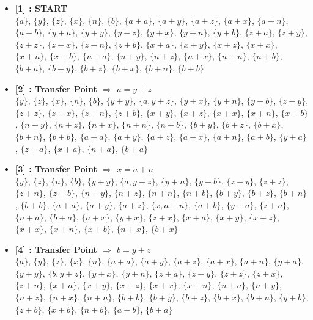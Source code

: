 \begin{itemize}

    \item \textbf{[1] : START}\\
        $\{a\}$, $\{y\}$, $\{z\}$, $\{x\}$, $\{n\}$, $\{b\}$, $\{a + a\}$, $\{a + y\}$, $\{a + z\}$, $\{a + x\}$, $\{a + n\}$, $\{a + b\}$, $\{y + a\}$, $\{y + y\}$, $\{y + z\}$, $\{y + x\}$, $\{y + n\}$, $\{y + b\}$, $\{z + a\}$, $\{z + y\}$, $\{z + z\}$, $\{z + x\}$, $\{z + n\}$, $\{z + b\}$, $\{x + a\}$, $\{x + y\}$, $\{x + z\}$, $\{x + x\}$, $\{x + n\}$, $\{x + b\}$, $\{n + a\}$, $\{n + y\}$, $\{n + z\}$, $\{n + x\}$, $\{n + n\}$, $\{n + b\}$, $\{b + a\}$, $\{b + y\}$, $\{b + z\}$, $\{b + x\}$, $\{b + n\}$, $\{b + b\}$

    \item \textbf{[2] : Transfer Point $\Rightarrow$ $a = y + z$}\\
        $\{y\}$, $\{z\}$, $\{x\}$, $\{n\}$, $\{b\}$, $\{y + y\}$, $\{a, y + z\}$, $\{y + x\}$, $\{y + n\}$, $\{y + b\}$, $\{z + y\}$, $\{z + z\}$, $\{z + x\}$, $\{z + n\}$, $\{z + b\}$, $\{x + y\}$, $\{x + z\}$, $\{x + x\}$, $\{x + n\}$, $\{x + b\}$, $\{n + y\}$, $\{n + z\}$, $\{n + x\}$, $\{n + n\}$, $\{n + b\}$, $\{b + y\}$, $\{b + z\}$, $\{b + x\}$, $\{b + n\}$, $\{b + b\}$, $\{a + a\}$, $\{a + y\}$, $\{a + z\}$, $\{a + x\}$, $\{a + n\}$, $\{a + b\}$, $\{y + a\}$, $\{z + a\}$, $\{x + a\}$, $\{n + a\}$, $\{b + a\}$

    \item \textbf{[3] : Transfer Point $\Rightarrow$ $x = a + n$}\\
        $\{y\}$, $\{z\}$, $\{n\}$, $\{b\}$, $\{y + y\}$, $\{a, y + z\}$, $\{y + n\}$, $\{y + b\}$, $\{z + y\}$, $\{z + z\}$, $\{z + n\}$, $\{z + b\}$, $\{n + y\}$, $\{n + z\}$, $\{n + n\}$, $\{n + b\}$, $\{b + y\}$, $\{b + z\}$, $\{b + n\}$, $\{b + b\}$, $\{a + a\}$, $\{a + y\}$, $\{a + z\}$, $\{x, a + n\}$, $\{a + b\}$, $\{y + a\}$, $\{z + a\}$, $\{n + a\}$, $\{b + a\}$, $\{a + x\}$, $\{y + x\}$, $\{z + x\}$, $\{x + a\}$, $\{x + y\}$, $\{x + z\}$, $\{x + x\}$, $\{x + n\}$, $\{x + b\}$, $\{n + x\}$, $\{b + x\}$

    \item \textbf{[4] : Transfer Point $\Rightarrow$ $b = y + z$}\\
        $\{a\}$, $\{y\}$, $\{z\}$, $\{x\}$, $\{n\}$, $\{a + a\}$, $\{a + y\}$, $\{a + z\}$, $\{a + x\}$, $\{a + n\}$, $\{y + a\}$, $\{y + y\}$, $\{b, y + z\}$, $\{y + x\}$, $\{y + n\}$, $\{z + a\}$, $\{z + y\}$, $\{z + z\}$, $\{z + x\}$, $\{z + n\}$, $\{x + a\}$, $\{x + y\}$, $\{x + z\}$, $\{x + x\}$, $\{x + n\}$, $\{n + a\}$, $\{n + y\}$, $\{n + z\}$, $\{n + x\}$, $\{n + n\}$, $\{b + b\}$, $\{b + y\}$, $\{b + z\}$, $\{b + x\}$, $\{b + n\}$, $\{y + b\}$, $\{z + b\}$, $\{x + b\}$, $\{n + b\}$, $\{a + b\}$, $\{b + a\}$


\end{itemize}
